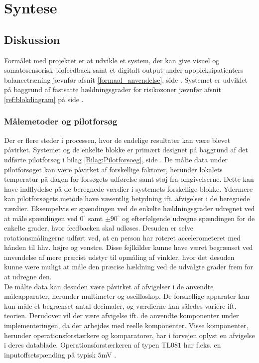 \chapter{Syntese}
\section{Diskussion}
Formålet med projektet er at udvikle et system, der kan give visuel og somatosensorisk biofeedback samt et digitalt output under apopleksipatienters balancetræning jævnfør afsnit \ref{formaal_anvendelse}, side \pageref{formaal_anvendelse}. Systemet er udviklet på baggrund af fastsatte hældningsgrader for risikozoner jævnfør afsnit \ref{ref:blokdiagram} på side \pageref{ref:blokdiagram}.

\subsection{Målemetoder og pilotforsøg}
Der er flere steder i processen, hvor de endelige resultater kan være blevet påvirket. Systemet og de enkelte blokke er primært designet på baggrund af det udførte pilotforsøg i bilag \ref{Bilag:Pilotforsoeg}, side \pageref{Bilag:Pilotforsoeg}. De målte data under pilotforsøget kan være påvirket af forskellige faktorer, herunder lokalets temperatur på dagen for forsøgets udførelse samt støj fra omgivelserne. Dette kan have indflydelse på de beregnede værdier i systemets forskellige blokke.
Ydermere kan pilotforsøgets metode have væsentlig betydning ift. afvigelser i de beregnede værdier. Eksempelvis er spændingen ved de enkelte hældningsgrader udregnet ved at måle spændingen ved $0^{\circ}$ samt $\pm90^{\circ}$ og efterfølgende udregne spændingen for de enkelte grader, hvor feedbacken skal udløses. Desuden er selve rotationsmålingerne udført ved, at en person har roteret accelerometeret med hånden til hhv. højre og venstre. Disse fejlkilder kunne have været begrænset ved anvendelse af mere præcist udstyr til opmåling af vinkler, hvor det desuden kunne være muligt at måle den præcise hældning ved de udvalgte grader frem for at udregne den.  \\
De målte data kan desuden være påvirket af afvigelser i de anvendte måleapparater, herunder multimeter og oscilloskop. De forskellige apparater kan kun måle et begrænset antal decimaler, og værdierne kan således variere ift. teorien. Derudover vil der være afvigelse ift. de anvendte komponenter under implementeringen, da der arbejdes med reelle komponenter. Visse komponenter, herunder operationsforstærkere og komparatorer, har i forvejen oplyst en afvigelse i deres datablade. Operationsforstærkeren af typen TL$081$ har f.eks. en inputoffsetspænding på typisk $5$mV \cite{Corporation1995}. %

